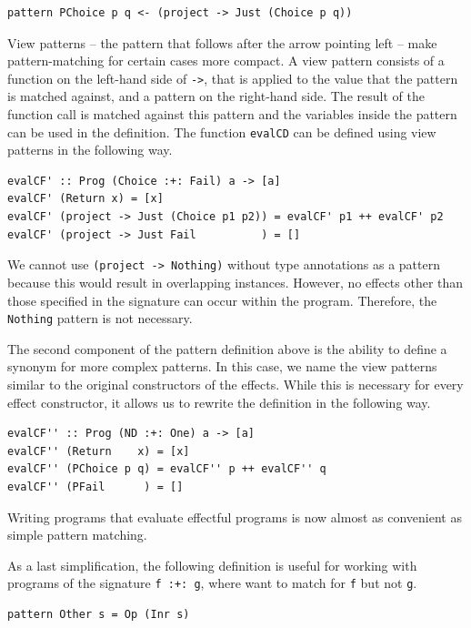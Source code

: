 \documentclass[a4paper, 11pt, fleqn, twoside]{scrreprt}
\newcommand{\hinl}[1]{\texttt{#1}}
\begin{document}
\begin{verbatim}
pattern PChoice p q <- (project -> Just (Choice p q))
\end{verbatim}

View patterns -- the pattern that follows after the arrow pointing left -- make pattern-matching for certain cases more compact.
A view pattern consists of a function on the left-hand side of \hinl{->}, that is applied to the value that the pattern is matched against, and a pattern on the right-hand side.
The result of the function call is matched against this pattern and the variables inside the pattern can be used in the definition.
The function \hinl{evalCD} can be defined using view patterns in the following way.

\begin{verbatim}
evalCF' :: Prog (Choice :+: Fail) a -> [a]
evalCF' (Return x) = [x]
evalCF' (project -> Just (Choice p1 p2)) = evalCF' p1 ++ evalCF' p2
evalCF' (project -> Just Fail          ) = []
\end{verbatim}

We cannot use \hinl{(project -> Nothing)} without type annotations as a pattern because this would result in overlapping instances.
However, no effects other than those specified in the signature can occur within the program.
Therefore, the \hinl{Nothing} pattern is not necessary.

The second component of the pattern definition above is the ability to define a synonym for more complex patterns.
In this case, we name the view patterns similar to the original constructors of the effects.
While this is necessary for every effect constructor, it allows us to rewrite the definition in the following way.

\begin{verbatim}
evalCF'' :: Prog (ND :+: One) a -> [a]
evalCF'' (Return    x) = [x]
evalCF'' (PChoice p q) = evalCF'' p ++ evalCF'' q
evalCF'' (PFail      ) = []
\end{verbatim}

Writing programs that evaluate effectful programs is now almost as convenient as simple pattern matching.

As a last simplification, the following definition is useful for working with programs of the signature \hinl{f :+: g}, where want to match for \hinl{f} but not \hinl{g}.

\begin{verbatim}
pattern Other s = Op (Inr s)
\end{verbatim}
\end{document}

